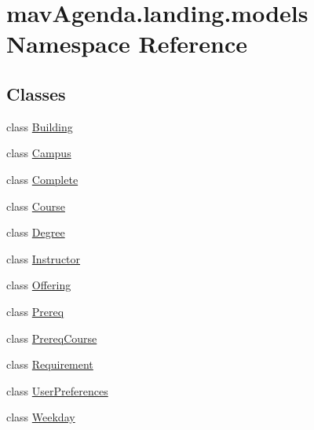 \hypertarget{namespacemavAgenda_1_1landing_1_1models}{}\section{mav\+Agenda.\+landing.\+models Namespace Reference}
\label{namespacemavAgenda_1_1landing_1_1models}
\subsection*{Classes}
\begin{DoxyCompactItemize}
\item 
class \mbox{\hyperlink{classmavAgenda_1_1landing_1_1models_1_1Building}{Building}}
\item 
class \mbox{\hyperlink{classmavAgenda_1_1landing_1_1models_1_1Campus}{Campus}}
\item 
class \mbox{\hyperlink{classmavAgenda_1_1landing_1_1models_1_1Complete}{Complete}}
\item 
class \mbox{\hyperlink{classmavAgenda_1_1landing_1_1models_1_1Course}{Course}}
\item 
class \mbox{\hyperlink{classmavAgenda_1_1landing_1_1models_1_1Degree}{Degree}}
\item 
class \mbox{\hyperlink{classmavAgenda_1_1landing_1_1models_1_1Instructor}{Instructor}}
\item 
class \mbox{\hyperlink{classmavAgenda_1_1landing_1_1models_1_1Offering}{Offering}}
\item 
class \mbox{\hyperlink{classmavAgenda_1_1landing_1_1models_1_1Prereq}{Prereq}}
\item 
class \mbox{\hyperlink{classmavAgenda_1_1landing_1_1models_1_1PrereqCourse}{Prereq\+Course}}
\item 
class \mbox{\hyperlink{classmavAgenda_1_1landing_1_1models_1_1Requirement}{Requirement}}
\item 
class \mbox{\hyperlink{classmavAgenda_1_1landing_1_1models_1_1UserPreferences}{User\+Preferences}}
\item 
class \mbox{\hyperlink{classmavAgenda_1_1landing_1_1models_1_1Weekday}{Weekday}}
\end{DoxyCompactItemize}

